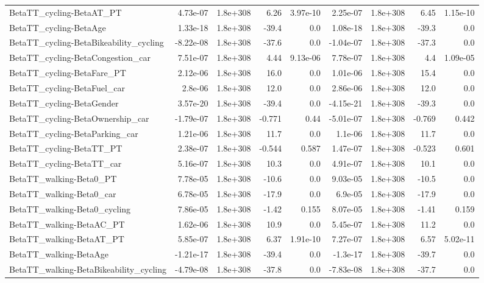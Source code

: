 \begin{tabular}{lrrrrrrrr}
BetaTT_cycling-BetaAT_PT & 4.73e-07 & 1.8e+308 & 6.26 & 3.97e-10 & 2.25e-07 & 1.8e+308 & 6.45 & 1.15e-10 \\
BetaTT_cycling-BetaAge & 1.33e-18 & 1.8e+308 & -39.4 & 0.0 & 1.08e-18 & 1.8e+308 & -39.3 & 0.0 \\
BetaTT_cycling-BetaBikeability_cycling & -8.22e-08 & 1.8e+308 & -37.6 & 0.0 & -1.04e-07 & 1.8e+308 & -37.3 & 0.0 \\
BetaTT_cycling-BetaCongestion_car & 7.51e-07 & 1.8e+308 & 4.44 & 9.13e-06 & 7.78e-07 & 1.8e+308 & 4.4 & 1.09e-05 \\
BetaTT_cycling-BetaFare_PT & 2.12e-06 & 1.8e+308 & 16.0 & 0.0 & 1.01e-06 & 1.8e+308 & 15.4 & 0.0 \\
BetaTT_cycling-BetaFuel_car & 2.8e-06 & 1.8e+308 & 12.0 & 0.0 & 2.86e-06 & 1.8e+308 & 12.0 & 0.0 \\
BetaTT_cycling-BetaGender & 3.57e-20 & 1.8e+308 & -39.4 & 0.0 & -4.15e-21 & 1.8e+308 & -39.3 & 0.0 \\
BetaTT_cycling-BetaOwnership_car & -1.79e-07 & 1.8e+308 & -0.771 & 0.44 & -5.01e-07 & 1.8e+308 & -0.769 & 0.442 \\
BetaTT_cycling-BetaParking_car & 1.21e-06 & 1.8e+308 & 11.7 & 0.0 & 1.1e-06 & 1.8e+308 & 11.7 & 0.0 \\
BetaTT_cycling-BetaTT_PT & 2.38e-07 & 1.8e+308 & -0.544 & 0.587 & 1.47e-07 & 1.8e+308 & -0.523 & 0.601 \\
BetaTT_cycling-BetaTT_car & 5.16e-07 & 1.8e+308 & 10.3 & 0.0 & 4.91e-07 & 1.8e+308 & 10.1 & 0.0 \\
BetaTT_walking-Beta0_PT & 7.78e-05 & 1.8e+308 & -10.6 & 0.0 & 9.03e-05 & 1.8e+308 & -10.5 & 0.0 \\
BetaTT_walking-Beta0_car & 6.78e-05 & 1.8e+308 & -17.9 & 0.0 & 6.9e-05 & 1.8e+308 & -17.9 & 0.0 \\
BetaTT_walking-Beta0_cycling & 7.86e-05 & 1.8e+308 & -1.42 & 0.155 & 8.07e-05 & 1.8e+308 & -1.41 & 0.159 \\
BetaTT_walking-BetaAC_PT & 1.62e-06 & 1.8e+308 & 10.9 & 0.0 & 5.45e-07 & 1.8e+308 & 11.2 & 0.0 \\
BetaTT_walking-BetaAT_PT & 5.85e-07 & 1.8e+308 & 6.37 & 1.91e-10 & 7.27e-07 & 1.8e+308 & 6.57 & 5.02e-11 \\
BetaTT_walking-BetaAge & -1.21e-17 & 1.8e+308 & -39.4 & 0.0 & -1.3e-17 & 1.8e+308 & -39.7 & 0.0 \\
BetaTT_walking-BetaBikeability_cycling & -4.79e-08 & 1.8e+308 & -37.8 & 0.0 & -7.83e-08 & 1.8e+308 & -37.7 & 0.0 \\

\end{tabular}
